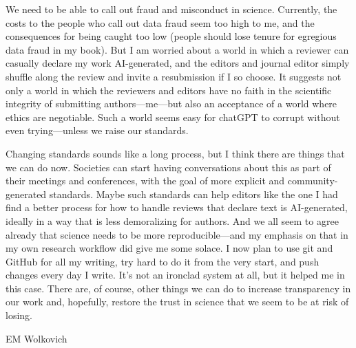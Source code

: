 \documentclass[11pt]{article}
\begin{document}
We need to be able to call out fraud and misconduct in science. Currently, the costs to the people who call out data fraud seem too high to me, and the consequences for being caught too low (people should lose tenure for egregious data fraud in my book). But I am worried about a world in which a reviewer can casually declare my work AI-generated, and the editors and journal editor simply shuffle along the review and invite a resubmission if I so choose. It suggests not only a world in which the reviewers and editors have no faith in the scientific integrity of submitting authors---me---but also an acceptance of a world where ethics are negotiable. Such a world seems easy for chatGPT to corrupt without even trying---unless we raise our standards. 

Changing standards sounds like a long process, but I think there are things that we can do now. Societies can start having conversations about this as part of their meetings and conferences, with the goal of more explicit and community-generated standards. Maybe such standards can help editors like the one I had find a better process for how to handle reviews that declare text is AI-generated, ideally in a way that is less demoralizing for authors. And we all seem to agree already that science needs to be more reproducible---and my emphasis on that in my own research workflow did give me some solace. I now plan to  use git and GitHub for all my writing, try hard to do it from the very start, and push changes every day I write. It’s not an ironclad system at all, but it helped me in this case. There are, of course, other things we can do to increase transparency in our work and, hopefully, restore the trust in science that we seem to be at risk of losing.

EM Wolkovich
\end{document}

